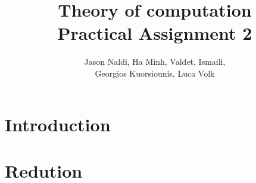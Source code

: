 \documentclass[12pt]{article}
\title{Theory of computation\\ Practical Assignment 2}
\author{Jason Naldi, Ha Minh, Valdet, Ismaili,\\ Georgios Kuorsiounis, Luca Volk}
\begin{document}
\maketitle

\section{Introduction}



\section{Redution}
\end{document}
